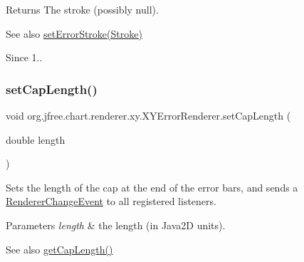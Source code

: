 \begin{DoxyReturn}{Returns}
The stroke (possibly {\ttfamily null}).
\end{DoxyReturn}
\begin{DoxySeeAlso}{See also}
\mbox{\hyperlink{classorg_1_1jfree_1_1chart_1_1renderer_1_1xy_1_1_x_y_error_renderer_a29583e5b484669781822928997ccced5}{set\+Error\+Stroke(\+Stroke)}}
\end{DoxySeeAlso}
\begin{DoxySince}{Since}
1.. 
\end{DoxySince}
\mbox{\label{classorg_1_1jfree_1_1chart_1_1renderer_1_1xy_1_1_x_y_error_renderer_a78522ec7f32d90e558624ff4dab196cb}} 
\subsubsection{\texorpdfstring{set\+Cap\+Length()}{setCapLength()}}
{\footnotesize\ttfamily void org.\+jfree.\+chart.\+renderer.\+xy.\+X\+Y\+Error\+Renderer.\+set\+Cap\+Length (\begin{DoxyParamCaption}\item[{double}]{length }\end{DoxyParamCaption})}

Sets the length of the cap at the end of the error bars, and sends a \mbox{\hyperlink{}{Renderer\+Change\+Event}} to all registered listeners.


\begin{DoxyParams}{Parameters}
{\em length} & the length (in Java2D units).\\
\hline
\end{DoxyParams}
\begin{DoxySeeAlso}{See also}
\mbox{\hyperlink{classorg_1_1jfree_1_1chart_1_1renderer_1_1xy_1_1_x_y_error_renderer_ad72439c734df92e2dd89e4fa6dc5f071}{get\+Cap\+Length()}} 
\end{DoxySeeAlso}
\mbox{\label{classorg_1_1jfree_1_1chart_1_1renderer_1_1xy_1_1_x_y_error_renderer_a77815f8cffa301cab035dfb21d5d3481}} 
